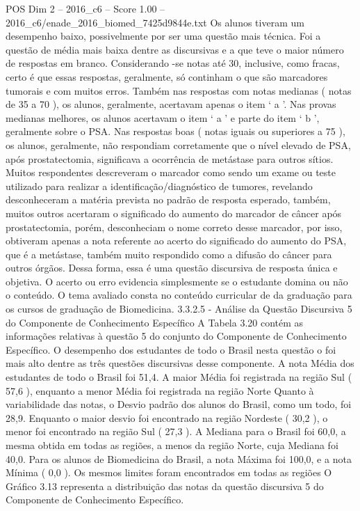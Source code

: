 \begin{textsample}{POS Dim 2 – 2016\_c6 – Score 1.00 – 2016\_c6/enade\_2016\_biomed\_7425d9844e.txt}
Os alunos tiveram um desempenho baixo, possivelmente por ser uma questão mais técnica.
Foi a questão de média mais baixa dentre as discursivas e a que teve o maior número de respostas em branco.
Considerando -se notas até 30, inclusive, como fracas, certo é que essas respostas, geralmente, só continham o que são marcadores tumorais e com muitos erros.
Também nas respostas com notas medianas ( notas de 35 a 70 ), os alunos, geralmente, acertavam apenas o item ‘ a ’.
Nas provas medianas melhores, os alunos acertavam o item ‘ a ’ e parte do item ‘ b ’, geralmente sobre o PSA.
Nas respostas boas ( notas iguais ou superiores a 75 ), os alunos, geralmente, não respondiam corretamente que o nível elevado de PSA, após prostatectomia, significava a ocorrência de metástase para outros sítios.
Muitos respondentes descreveram o marcador como sendo um exame ou teste utilizado para realizar a identificação/diagnóstico de tumores, revelando desconheceram a matéria prevista no padrão de resposta esperado, também, muitos outros acertaram o significado do aumento do marcador de câncer após prostatectomia, porém, desconheciam o nome correto desse marcador, por isso, obtiveram apenas a nota referente ao acerto do significado do aumento do PSA, que é a metástase, também muito respondido como a difusão do câncer para outros órgãos.
Dessa forma, essa é uma questão discursiva de resposta única e objetiva.
O acerto ou erro evidencia simplesmente se o estudante domina ou não o conteúdo.
O tema avaliado consta no conteúdo curricular de da graduação para os cursos de graduação de Biomedicina. 3.3.2.5 - Análise da Questão Discursiva 5 do Componente de Conhecimento Específico A Tabela 3.20 contém as informações relativas à questão 5 do conjunto do Componente de Conhecimento Específico.
O desempenho dos estudantes de todo o Brasil nesta questão o foi mais alto dentre as três questões discursivas desse componente.
A nota Média dos estudantes de todo o Brasil foi 51,4.
A maior Média foi registrada na região Sul ( 57,6 ), enquanto a menor Média foi registrada na região Norte Quanto à variabilidade das notas, o Desvio padrão dos alunos do Brasil, como um todo, foi 28,9.
Enquanto o maior desvio foi encontrado na região Nordeste ( 30,2 ), o menor foi encontrado na região Sul ( 27,3 ).
A Mediana para o Brasil foi 60,0, a mesma obtida em todas as regiões, a menos da região Norte, cuja Mediana foi 40,0.
Para os alunos de Biomedicina do Brasil, a nota Máxima foi 100,0, e a nota Mínima ( 0,0 ).
Os mesmos limites foram encontrados em todas as regiões O Gráfico 3.13 representa a distribuição das notas da questão discursiva 5 do Componente de Conhecimento Específico.

\end{textsample}

